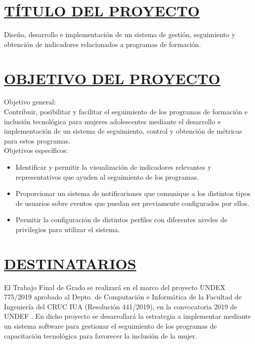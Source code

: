 \section*{\underline{TÍTULO DEL PROYECTO}}
Diseño, desarrollo e implementación de un sistema de gestión, seguimiento y obtención de indicadores relacionados a programas de formación.


\section*{\underline{OBJETIVO DEL PROYECTO}}
Objetivo general:\\

Contribuir, posibilitar y facilitar el seguimiento de los programas de formación e inclusión tecnológica para mujeres adolescentes mediante el desarrollo e implementación de un sistema de seguimiento, control y obtención de métricas para estos programas.\\

Objetivos específicos:
\begin{itemize}
	\item Identificar y permitir la visualización de indicadores relevantes y representativos que ayuden al seguimiento de los programas.
	\item Proporcionar un sistema de notificaciones que comunique a los distintos tipos de usuarios sobre eventos que puedan ser previamente configurados por ellos.
	\item Permitir la configuración de distintos perfiles con diferentes niveles de  privilegios para utilizar el sistema.\\
\end{itemize}


\section*{\underline{DESTINATARIOS}}
El Trabajo Final de Grado se realizará en el marco del proyecto UNDEX 775/2019 aprobado al Depto. de Computación e Informática de la Facultad de Ingeniería del CRUC IUA (Resolución 441/2019), en la convocatoria 2019 de UNDEF \textbf{\cite{ResolucionUndex}}. En dicho proyecto se desarrollará la estrategia a implementar mediante un sistema software para gestionar el seguimiento de los programas de capacitación tecnológica para favorecer la inclusión de la mujer. \\


